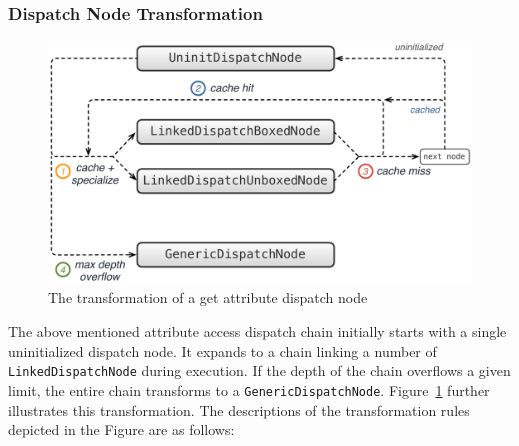 \subsubsection{Dispatch Node Transformation}

\begin{figure}
\centering
\includegraphics[scale=.65]{figures/ch5-attribute-dispatch-transformation}
\caption{The transformation of a get attribute dispatch node}
\label{ch5-ch5-attribute-dispatch-transformation}
\end{figure}

The above mentioned attribute access dispatch chain initially starts with a single uninitialized dispatch node.
It expands to a chain linking a number of \texttt{LinkedDispatchNode} during execution.
If the depth of the chain overflows a given limit, the entire chain transforms to a \texttt{GenericDispatchNode}.
Figure~\ref{ch5-ch5-attribute-dispatch-transformation} further illustrates this transformation.
The descriptions of the transformation rules depicted in the Figure are as follows:

